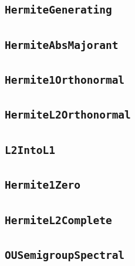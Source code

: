 \documentclass[11pt]{amsart}
\theoremstyle{definition}
\begin{document}
\subsection{\texorpdfstring{\texttt{HermiteGenerating}}{HermiteGenerating}}\label{node:HermiteGenerating}


\subsection{\texorpdfstring{\texttt{HermiteAbsMajorant}}{HermiteAbsMajorant}}\label{node:HermiteAbsMajorant}


\subsection{\texorpdfstring{\texttt{Hermite1Orthonormal}}{Hermite1Orthonormal}}\label{node:Hermite1Orthonormal}


\subsection{\texorpdfstring{\texttt{HermiteL2Orthonormal}}{HermiteL2Orthonormal}}\label{node:HermiteL2Orthonormal}


\subsection{\texorpdfstring{\texttt{L2IntoL1}}{L2IntoL1}}\label{node:L2IntoL1}


\subsection{\texorpdfstring{\texttt{Hermite1Zero}}{Hermite1Zero}}\label{node:Hermite1Zero}


\subsection{\texorpdfstring{\texttt{HermiteL2Complete}}{HermiteL2Complete}}\label{node:HermiteL2Complete}


\subsection{\texorpdfstring{\texttt{OUSemigroupSpectral}}{OUSemigroupSpectral}}\label{node:OUSemigroupSpectral}

\end{document}
